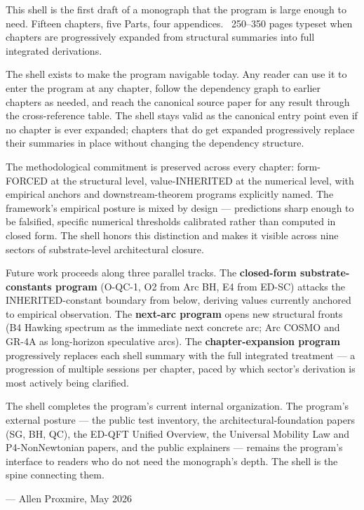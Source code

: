 \documentclass[11pt]{book}
\begin{document}
This shell is the first draft of a monograph that the program is large enough to need. Fifteen chapters, five Parts, four appendices. ~250–350 pages typeset when chapters are progressively expanded from structural summaries into full integrated derivations.

The shell exists to make the program navigable today. Any reader can use it to enter the program at any chapter, follow the dependency graph to earlier chapters as needed, and reach the canonical source paper for any result through the cross-reference table. The shell stays valid as the canonical entry point even if no chapter is ever expanded; chapters that do get expanded progressively replace their summaries in place without changing the dependency structure.

The methodological commitment is preserved across every chapter: form-FORCED at the structural level, value-INHERITED at the numerical level, with empirical anchors and downstream-theorem programs explicitly named. The framework's empirical posture is mixed by design — predictions sharp enough to be falsified, specific numerical thresholds calibrated rather than computed in closed form. The shell honors this distinction and makes it visible across nine sectors of substrate-level architectural closure.

Future work proceeds along three parallel tracks. The \textbf{closed-form substrate-constants program} (O-QC-1, O2 from Arc BH, E4 from ED-SC) attacks the INHERITED-constant boundary from below, deriving values currently anchored to empirical observation. The \textbf{next-arc program} opens new structural fronts (B4 Hawking spectrum as the immediate next concrete arc; Arc COSMO and GR-4A as long-horizon speculative arcs). The \textbf{chapter-expansion program} progressively replaces each shell summary with the full integrated treatment — a progression of multiple sessions per chapter, paced by which sector's derivation is most actively being clarified.

The shell completes the program's current internal organization. The program's external posture — the public test inventory, the architectural-foundation papers (SG, BH, QC), the ED-QFT Unified Overview, the Universal Mobility Law and P4-NonNewtonian papers, and the public explainers — remains the program's interface to readers who do not need the monograph's depth. The shell is the spine connecting them.

— Allen Proxmire, May 2026
\end{document}
